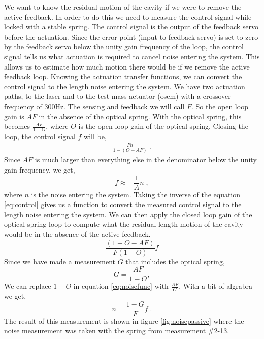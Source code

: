 We want to know the residual motion of the cavity if we were to remove the
active feedback.
In order to do this we need to measure the control signal while locked with
a stable spring.
The control signal is the output of the feedback servo before the
actuation.
Since the error point (input to feedback servo) is set to zero by the
feedback servo below the unity gain frequency of the loop, the control
signal tells us what actuation is required to cancel noise entering the
system.
This allows us to estimate how much motion there would be if we remove
the active feedback loop.
Knowing the actuation transfer functions, we can convert the control signal
to the length noise entering the system.
We have two actuation paths, to the laser and to the test mass actuator
(\ac{osem}) with a crossover frequency of 300Hz.
The sensing and feedback we will call $F$.
So the open loop gain is $AF$ in the absence of the optical spring.
With the optical spring, this becomes $\frac{AF}{1-O}$, where $O$ is the
open loop gain of the optical spring.
Closing the loop, the control signal $f$ will be,
\begin{align}
\frac{Fn}{1-\left(O+AF\right)} \label{eq:control} \;.
\end{align}
Since $AF$ is much larger than everything else in the denominator below
the unity gain frequency, we get,
\begin{equation}
f\approx -\frac{1}{A}n \label{eq:noisefunc} \;,
\end{equation}
where $n$ is the noise entering the system.
Taking the inverse of the equation \eqref{eq:control} gives us a function
to convert the measured control signal to the length noise entering the system.
We can then apply the closed loop gain of the optical spring loop to compute
what the residual length motion of the cavity would be in the absence of the
active feedback.
\begin{equation}
\frac{\left(1-O-AF\right)}{F\left(1-O\right)}f
\end{equation}
Since we have made a measurement $G$ that includes the optical spring,
\begin{equation}
G=\frac{AF}{1-O},
\end{equation}
We can replace $1-O$ in equation \eqref{eq:noisefunc} with
$\frac{AF}{G}$. With a bit of algrabra we get,
\begin{equation}
n = \frac{1-G}{F}f \;.
\end{equation}
The result of this measurement is shown in figure \ref{fig:noisepassive}
where the noise measurement was taken with the spring from measurement \#2-13.


